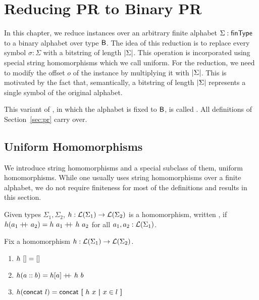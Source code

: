 \newcommand{\strentD}[1]{\ensuremath{\rightsquigarrow^D}}
\newcommand{\FlatPR}{\textbf{FlatPR}}

\chapter{Reducing PR to Binary PR}\label{chap:pr_bpr}
In this chapter, we reduce \PR{} instances over an arbitrary finite alphabet $\Sigma : \textsf{finType}$ to a binary alphabet over type $\textsf{B}$. The idea of this reduction is to replace every symbol $\sigma : \Sigma$ with a bitstring of length $|\Sigma|$. This operation is incorporated using special string homomorphisms which we call uniform.
For the reduction, we need to modify the offset $o$ of the \PR{} instance by multiplying it with $|\Sigma|$. This is motivated by the fact that, semantically, a bitstring of length $|\Sigma|$ represents a single symbol of the original alphabet.

This variant of \PR{}, in which the alphabet is fixed to $\textsf{B}$, is called \BPR{}. All definitions of Section~\ref{sec:pr} carry over.

\section{Uniform Homomorphisms}
We introduce string homomorphisms and a special subclass of them, uniform homomorphisms.
While one usually uses string homomorphisms over a finite alphabet, we do not require finiteness for most of the definitions and results in this section.

\newcommand{\homomorphism}{\textsf{homomorphism}}
\begin{definition}
  Given types $\Sigma_1, \Sigma_2$, $h : \mathcal{L} (\Sigma_1) \rightarrow \mathcal{L} (\Sigma_2)$ is a homomorphism, written \mnotec{$\homomorphism~h$}, if $h (a_1 +\kern-1.3ex+\kern0.8ex a_2) = h~a_1 +\kern-1.3ex+\kern0.8ex h~a_2$ for all $a_1, a_2 : \mathcal{L} (\Sigma_1)$. 
\end{definition}

\begin{fact}
  Fix a homomorphism $h : \mathcal{L} (\Sigma_1) \rightarrow \mathcal{L} (\Sigma_2)$. 
  \begin{enumerate}
    \item $h~[] = []$
    \item $h (a :: b) = h [a] +\kern-1.3ex+\kern0.8ex h~b$
    \item $h (\textsf{concat}~l) = \textsf{concat}~\textbf{[}~ h~x ~\textbf{|}~ x \in l ~\textbf{]}$
  \end{enumerate}
\end{fact}

